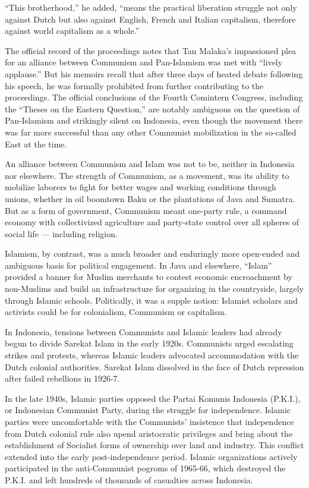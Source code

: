 ``This brotherhood,'' he added, ``means the practical liberation
struggle not only against Dutch but also against English, French and
Italian capitalism, therefore against world capitalism as a whole.''

The official record of the proceedings notes that Tan Malaka's
impassioned plea for an alliance between Communism and Pan-Islamism was
met with ``lively applause.'' But his memoirs recall that after three
days of heated debate following his speech, he was formally prohibited
from further contributing to the proceedings. The official conclusions
of the Fourth Comintern Congress, including the ``Theses on the Eastern
Question,'' are notably ambiguous on the question of Pan-Islamism and
strikingly silent on Indonesia, even though the movement there was far
more successful than any other Communist mobilization in the so-called
East at the time.

An alliance between Communism and Islam was not to be, neither in
Indonesia nor elsewhere. The strength of Communism, as a movement, was
its ability to mobilize laborers to fight for better wages and working
conditions through unions, whether in oil boomtown Baku or the
plantations of Java and Sumatra. But as a form of government, Communism
meant one-party rule, a command economy with collectivized agriculture
and party-state control over all spheres of social life --- including
religion.

Islamism, by contrast, was a much broader and enduringly more open-ended
and ambiguous basis for political engagement. In Java and elsewhere,
``Islam'' provided a banner for Muslim merchants to contest economic
encroachment by non-Muslims and build an infrastructure for organizing
in the countryside, largely through Islamic schools. Politically, it was
a supple notion: Islamist scholars and activists could be for
colonialism, Communism or capitalism.

In Indonesia, tensions between Communists and Islamic leaders had
already begun to divide Sarekat Islam in the early 1920s. Communists
urged escalating strikes and protests, whereas Islamic leaders advocated
accommodation with the Dutch colonial authorities. Sarekat Islam
dissolved in the face of Dutch repression after failed rebellions in
1926-7.

In the late 1940s, Islamic parties opposed the Partai Komunis Indonesia
(P.K.I.), or Indonesian Communist Party, during the struggle for
independence. Islamic parties were uncomfortable with the Communists'
insistence that independence from Dutch colonial rule also upend
aristocratic privileges and bring about the establishment of Socialist
forms of ownership over land and industry. This conflict extended into
the early post-independence period. Islamic organizations actively
participated in the anti-Communist pogroms of 1965-66, which destroyed
the P.K.I. and left hundreds of thousands of casualties across
Indonesia.

